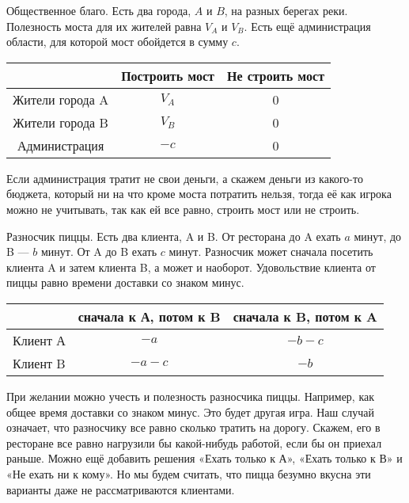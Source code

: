\begin{myex} \label{bridge}
Общественное благо. Есть два города, $ A $ и $ B $, на разных берегах реки. Полезность моста для их жителей равна $ V_{A} $ и $ V_{B} $. Есть ещё администрация области, для которой мост обойдется в сумму $ c $.


\begin{tabular}{c|cc}
& Построить мост & Не строить мост \\
\hline
Жители города A & $ V_{A} $ & 0 \\
Жители города B & $ V_{B} $ & 0 \\
Администрация & $-c$ & 0 \\
\end{tabular}

Если администрация тратит не свои деньги, а скажем деньги из какого-то бюджета, который ни на что кроме моста потратить нельзя, тогда её как игрока можно не учитывать, так как ей все равно, строить мост или не строить.

\end{myex}

\begin{myex} \label{pizza} Разносчик пиццы. Есть два клиента, A и B. От ресторана до A ехать $ a $ минут, до B — $ b $ минут. От A до B ехать $ c $ минут. Разносчик может сначала посетить клиента A и затем клиента B, а может и наоборот. Удовольствие клиента от пиццы равно времени доставки со знаком минус.


\begin{tabular}{c|cc}
& сначала к А, потом к B & сначала к B, потом к A \\
\hline
Клиент А & $-a$ & $-b-c$ \\
Клиент B & $-a-c$ & $-b$ \\
\end{tabular}

При желании можно учесть и полезность разносчика пиццы. Например, как общее время доставки со знаком минус. Это будет другая игра. Наш случай означает, что разносчику все равно сколько тратить на дорогу. Скажем, его в ресторане все равно нагрузили бы какой-нибудь работой, если бы он приехал раньше. Можно ещё добавить решения «Ехать только к А», «Ехать только к В» и «Не ехать ни к кому». Но мы будем считать, что пицца безумно вкусна эти варианты даже не рассматриваются клиентами.

\end{myex}


